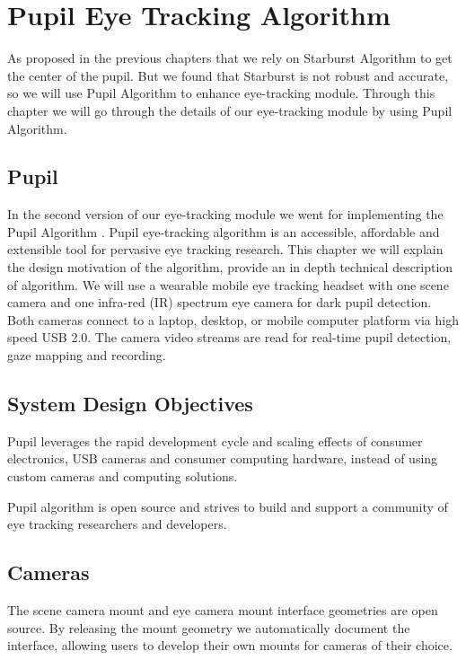 \chapter{Pupil Eye Tracking Algorithm}
As proposed in the previous chapters that we rely on Starburst \cite{starburst} Algorithm to get the center of the pupil. But we found that Starburst is not robust and accurate, so we will use Pupil Algorithm to enhance eye-tracking module. Through this chapter we will go through the details of our eye-tracking module by using Pupil Algorithm.

\section{Pupil}
In the second version of our eye-tracking module we went for implementing the Pupil Algorithm \cite{pupil}. Pupil eye-tracking algorithm is an accessible, affordable and extensible tool for pervasive eye tracking research. This chapter we will explain the design motivation of the algorithm, provide an in depth technical description of algorithm. We will use a wearable mobile eye tracking headset with one 
scene camera and one infra-red (IR) spectrum eye camera for dark pupil detection. Both cameras connect to a laptop, desktop, or mobile computer platform via high speed USB 2.0. The camera video streams are read for real-time pupil detection, gaze mapping and recording.  


\section{System Design Objectives}
	Pupil leverages the rapid development cycle and scaling effects of consumer electronics, USB cameras and consumer computing hardware, instead of using custom cameras and computing solutions. \bigskip

Pupil algorithm is open source and strives to build and support a community of eye tracking researchers and developers.\cite{pupil}

\section{Cameras} 
The scene camera mount and eye camera mount interface geometries are open source. By releasing the mount geometry we automatically document the interface, allowing users to develop their own mounts for cameras of their choice. \bigskip \cite{pupil}

